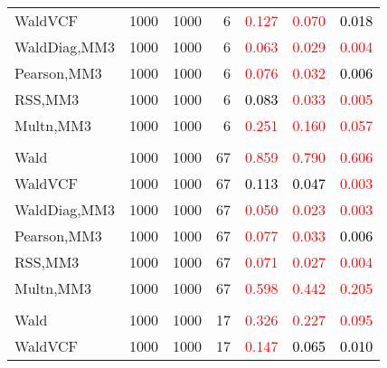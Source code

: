 \documentclass[
]{article}
\begin{document}
\begin{table}[H]
{\begin{tabular}[t]{lrrrrrr}
\hspace{1em}WaldVCF & 1000 & 1000 & 6 & \textcolor{red}{0.127} & \textcolor{red}{0.070} & \textcolor{black}{0.018}\\
\hspace{1em}WaldDiag,MM3 & 1000 & 1000 & 6 & \textcolor{red}{0.063} & \textcolor{red}{0.029} & \textcolor{red}{0.004}\\
\hspace{1em}Pearson,MM3 & 1000 & 1000 & 6 & \textcolor{red}{0.076} & \textcolor{red}{0.032} & \textcolor{black}{0.006}\\
\hspace{1em}RSS,MM3 & 1000 & 1000 & 6 & \textcolor{black}{0.083} & \textcolor{red}{0.033} & \textcolor{red}{0.005}\\
\hspace{1em}Multn,MM3 & 1000 & 1000 & 6 & \textcolor{red}{0.251} & \textcolor{red}{0.160} & \textcolor{red}{0.057}\\
\addlinespace[0.3em]
\multicolumn{7}{l}{\textbf{1F 15V}}\\
\hspace{1em}Wald & 1000 & 1000 & 67 & \textcolor{red}{0.859} & \textcolor{red}{0.790} & \textcolor{red}{0.606}\\
\hspace{1em}WaldVCF & 1000 & 1000 & 67 & \textcolor{black}{0.113} & \textcolor{black}{0.047} & \textcolor{red}{0.003}\\
\hspace{1em}WaldDiag,MM3 & 1000 & 1000 & 67 & \textcolor{red}{0.050} & \textcolor{red}{0.023} & \textcolor{red}{0.003}\\
\hspace{1em}Pearson,MM3 & 1000 & 1000 & 67 & \textcolor{red}{0.077} & \textcolor{red}{0.033} & \textcolor{black}{0.006}\\
\hspace{1em}RSS,MM3 & 1000 & 1000 & 67 & \textcolor{red}{0.071} & \textcolor{red}{0.027} & \textcolor{red}{0.004}\\
\hspace{1em}Multn,MM3 & 1000 & 1000 & 67 & \textcolor{red}{0.598} & \textcolor{red}{0.442} & \textcolor{red}{0.205}\\
\addlinespace[0.3em]
\multicolumn{7}{l}{\textbf{2F 10V}}\\
\hspace{1em}Wald & 1000 & 1000 & 17 & \textcolor{red}{0.326} & \textcolor{red}{0.227} & \textcolor{red}{0.095}\\
\hspace{1em}WaldVCF & 1000 & 1000 & 17 & \textcolor{red}{0.147} & \textcolor{black}{0.065} & \textcolor{black}{0.010}\\

\end{tabular}}
\end{table}
\end{document}
